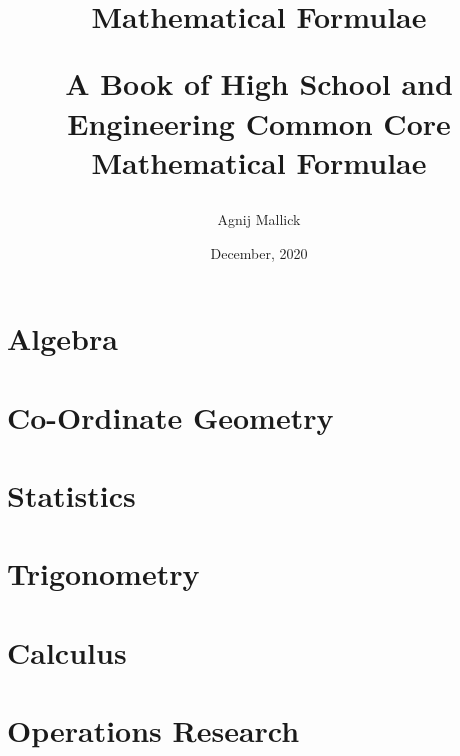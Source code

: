 \documentclass[openany, oneside]{book}
\title{Mathematical Formulae\\\begin{large}
A Book of High School and Engineering Common Core Mathematical Formulae
\end{large}}
\date{December, 2020}
\author{Agnij Mallick}
\begin{document}
\maketitle
\frontmatter

\tableofcontents
\newpage

\mainmatter

\part{Algebra}










\part{Co-Ordinate Geometry}











\part{Statistics}







\part{Trigonometry}




\part{Calculus}













\part{Operations Research}

\end{document}
